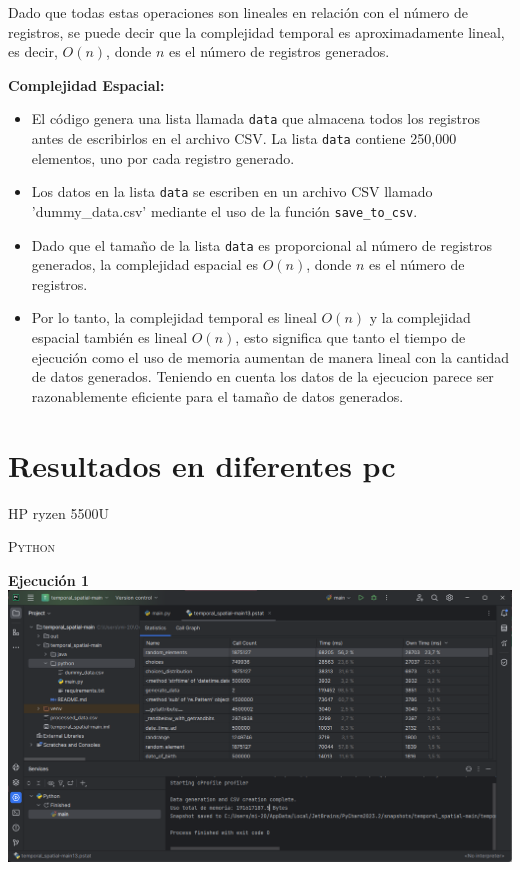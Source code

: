 \documentclass[a4paper,twocolumn,10pt]{article}
\begin{document}
Dado que todas estas operaciones son lineales en relación con el número de registros, se puede decir que la complejidad temporal es aproximadamente lineal, es decir, \(O(n)\), donde \(n\) es el número de registros generados.

\textbf{Complejidad Espacial:}
\begin{itemize}
    \item El código genera una lista llamada \texttt{data} que almacena todos los registros antes de escribirlos en el archivo CSV. La lista \texttt{data} contiene 250,000 elementos, uno por cada registro generado.
    \item Los datos en la lista \texttt{data} se escriben en un archivo CSV llamado 'dummy\_data.csv' mediante el uso de la función \texttt{save\_to\_csv}.
\end{itemize}

\begin{itemize}
\item Dado que el tamaño de la lista \texttt{data} es proporcional al número de registros generados, la complejidad espacial es \(O(n)\), donde \(n\) es el número de registros. 

\item Por lo tanto, la complejidad temporal es lineal \(O(n)\) y la complejidad espacial también es lineal \(O(n)\), esto significa que tanto el tiempo de ejecución como el uso de memoria aumentan de manera lineal con la cantidad de datos generados. Teniendo en cuenta los datos de la ejecucion parece ser razonablemente eficiente para el tamaño de datos generados.
\end{itemize}



\section{Resultados en diferentes pc}
\maketitle HP ryzen 5500U

\textsc{Python}

\textbf{Ejecución 1\\}
\includegraphics[width=0.9\linewidth]{HP Ryzen 5500U/Prueba python 1.png}
\end{document}

